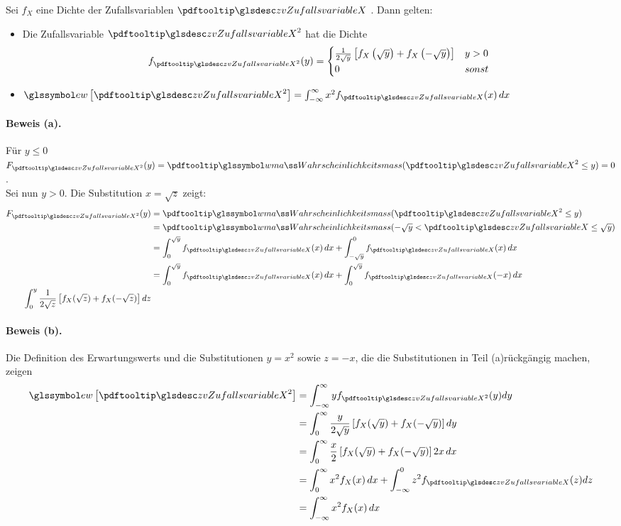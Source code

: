 \begin{satz} 
    Sei $f_X$ eine Dichte der Zufallsvariablen $\zvx$ . Dann gelten:
\begin{itemize}
    \item[(a)] Die Zufallsvariable $\zvx^2$ hat die Dichte
    \[
        f_{ \zvx^2} (y)= \begin{cases}
                          \frac{1}{2 \sqrt{y}} \left[ f_X \left(\sqrt{y}\right)+ f_X  \left(-\sqrt{y}\right)\right] & y > 0 \\
                          0 & sonst
        \end{cases}
    \]
    \item[(b)] \(\E{\zvx ^2} = \intinfs x^2 f_{\zvx}(x)\dx  \)
\end{itemize}
\paragraph{Beweis (a).}
    Für $y \leq 0$ $F_{ \zvx^2} (y)= \pe (\zvx ^2 \leq y)= 0$. \\
    Sei nun $y > 0$.
    Die Substitution $x = \sqrt{z}$ zeigt:
    \begin{align*}
        F_{ \zvx^2}(y)& = \pe (\zvx ^2 \leq y)\\
        & = \pe (- \sqrt{y} < \zvx \leq \sqrt{y})\\
        & = \int_0^{\sqrt{y}} f_{\zvx}(x)\dx + \int^0_{-\sqrt{y}} f_{\zvx}(x)\dx \\
        & = \int_0^{\sqrt{y}} f_{\zvx}(x)\dx + \int_0^{\sqrt{y}} f_{\zvx}(- x)\dx \\
        \int_0^{y} \frac{1}{2 \sqrt{z}} \left[  f_X (\sqrt{z})+ f_X (-\sqrt{z})\right] dz
    \end{align*}
\paragraph{Beweis (b).}
Die Definition des Erwartungswerts und die Substitutionen $y = x ^2$ sowie
$z = -x$, die die Substitutionen in Teil (a)rückgängig machen, zeigen
\begin{align*}
    \E{\zvx ^2} & = \intinfs y f_{ \zvx^2} (y)dy \\
    & = \int_{0}^{\infty} \frac{y}{2\sqrt{y}}  \left[  f_X (\sqrt{y})+ f_X (-\sqrt{y})\right] dy \\
    & = \int_{0}^{\infty} \frac{x}{2} \left[  f_X (\sqrt{y})+ f_X (-\sqrt{y})\right] 2x \dx  \\
    & = \int_{0}^{\infty} x^2 f_X (x)\dx + \int^0_{-\infty}  z^2 f_{\zvx}(z)dz \\
    & = \intinfs x^2 f_X (x)\dx
\end{align*}
\end{satz}

